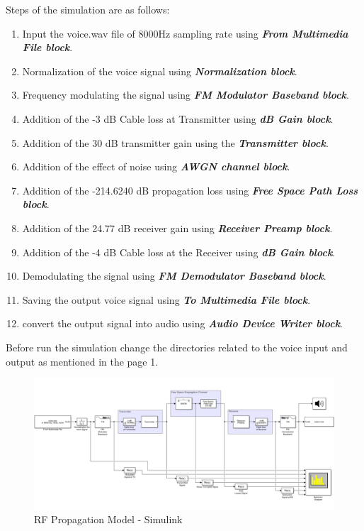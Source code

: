 \documentclass[a4paper,11pt]{article}%
\begin{document}
Steps of the simulation are as follows:
\begin{enumerate}[1.]
	\item Input the voice.wav file of 8000Hz sampling rate using \textbf{\textit{From Multimedia File block}}.
	\item Normalization of the voice signal using \textbf{\textit{Normalization block}}.
	\item Frequency modulating the signal using \textbf{\textit{FM Modulator Baseband block}}.
	\item Addition of the -3 dB Cable loss at Transmitter using \textbf{\textit{dB Gain block}}.
	\item Addition of the 30 dB transmitter gain using the \textbf{\textit{Transmitter block}}.
	\item Addition of the effect of noise using \textbf{\textit{AWGN channel block}}.
	\item Addition of the -214.6240 dB propagation loss using \textbf{\textit{Free Space Path Loss block}}.
	\item Addition of the 24.77 dB receiver gain using  \textbf{\textit{Receiver Preamp block}}.
	\item Addition of the -4 dB Cable loss at the Receiver using \textbf{\textit{dB Gain block}}.
	\item Demodulating the signal using \textbf{\textit{FM Demodulator Baseband block}}.
	\item Saving the output voice signal using \textbf{\textit{To Multimedia File block}}.
	\item convert the output signal into audio using \textbf{\textit{Audio Device Writer block}}.
\end{enumerate}
\vspace{1cm}
Before run the simulation change the directories related to the voice input and output as mentioned in the page 1.


\begin{figure}[!h]
	\centering
	\includegraphics[scale = 0.43 ]{figures/model} %
	\caption{RF Propagation Model - Simulink}
\end{figure}
\vspace{1.5cm}
\end{document}
